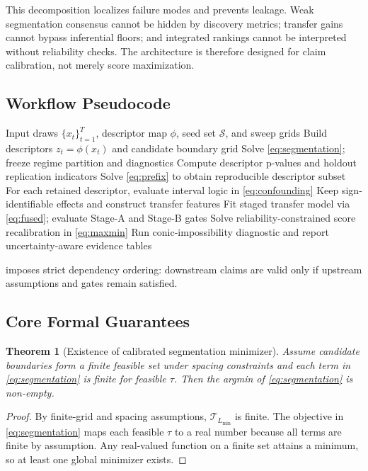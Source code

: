 \documentclass{article} %
\newtheorem{theorem}{Theorem}[section]
\begin{document}
This decomposition localizes failure modes and prevents leakage. Weak segmentation consensus cannot be hidden by discovery metrics; transfer gains cannot bypass inferential floors; and integrated rankings cannot be interpreted without reliability checks. The architecture is therefore designed for claim calibration, not merely score maximization.

\subsection{Workflow Pseudocode}
\begin{algorithm}[t]
\caption{Integrated bias-detection and reliability-calibrated ranking workflow}
\label{alg:pipeline}
\begin{algorithmic}
\STATE Input draws $\{x_t\}_{t=1}^T$, descriptor map $\phi$, seed set $\mathcal{S}$, and sweep grids
\STATE Build descriptors $z_t=\phi(x_t)$ and candidate boundary grid
\STATE Solve \eqref{eq:segmentation}; freeze regime partition and diagnostics
\STATE Compute descriptor p-values and holdout replication indicators
\STATE Solve \eqref{eq:prefix} to obtain reproducible descriptor subset
\STATE For each retained descriptor, evaluate interval logic in \eqref{eq:confounding}
\STATE Keep sign-identifiable effects and construct transfer features
\STATE Fit staged transfer model via \eqref{eq:fused}; evaluate Stage-A and Stage-B gates
\STATE Solve reliability-constrained score recalibration in \eqref{eq:maxmin}
\STATE Run conic-impossibility diagnostic and report uncertainty-aware evidence tables
\end{algorithmic}
\end{algorithm}

 imposes strict dependency ordering: downstream claims are valid only if upstream assumptions and gates remain satisfied.

\subsection{Core Formal Guarantees}
\begin{theorem}[Existence of calibrated segmentation minimizer]
Assume candidate boundaries form a finite feasible set under spacing constraints and each term in \eqref{eq:segmentation} is finite for feasible $\tau$. Then the argmin of \eqref{eq:segmentation} is non-empty.
\label{thm:segexist}
\end{theorem}
\begin{proof}
By finite-grid and spacing assumptions, $\mathcal{T}_{L_{\min}}$ is finite. The objective in \eqref{eq:segmentation} maps each feasible $\tau$ to a real number because all terms are finite by assumption. Any real-valued function on a finite set attains a minimum, so at least one global minimizer exists. \qedhere
\end{proof}
\end{document}
